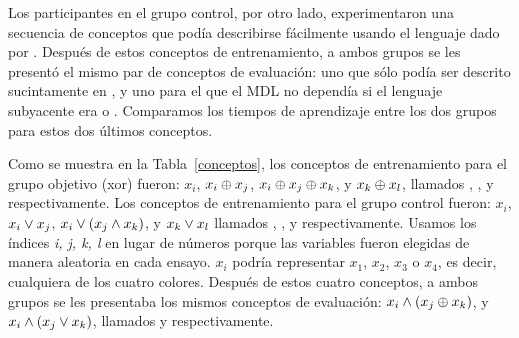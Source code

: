 Los participantes en el grupo control, por otro lado, experimentaron una secuencia de conceptos que podía describirse fácilmente usando el lenguaje dado por \grambool. Después de estos conceptos de entrenamiento, a ambos grupos se les presentó el mismo par de conceptos de evaluación: uno que sólo podía ser descrito sucintamente en \gramboolxor, y uno para el que el MDL no dependía si el lenguaje subyacente era \gramboolxor o \grambool. Comparamos los tiempos de aprendizaje entre los dos grupos para estos dos últimos conceptos.



Como se muestra en la Tabla~\ref{conceptos}, los conceptos de entrenamiento para el grupo objetivo (xor) fueron: $x_{i}$, $x_{i} \oplus x_{j}$, $x_{i} \oplus x_{j} \oplus x_{k}$, y $x_{k} \oplus x_{l}$, llamados \targeta, \targetb, \targetc y \targetd respectivamente. Los conceptos de entrenamiento para el grupo control fueron: $x_{i}$, $x_{i} \vee x_{j}$, $x_{i} \vee (x_{j} \wedge x_{k})$, y $x_{k} \vee x_{l}$ llamados \controla, \controlb, \controlc y \controld respectivamente. Usamos los índices \textit{i, j, k, l} en lugar de números porque las variables fueron elegidas de manera aleatoria en cada ensayo. $x_{i}$ podría representar $x_1$, $x_2$, $x_3$ o $x_4$, es decir, cualquiera de los cuatro colores. Después de estos cuatro conceptos, a ambos grupos se les presentaba los mismos conceptos de evaluación: $x_{i} \wedge (x_{j} \oplus x_{k})$, y $x_{i} \wedge (x_{j} \vee x_{k})$, llamados \testa y \testb respectivamente.


